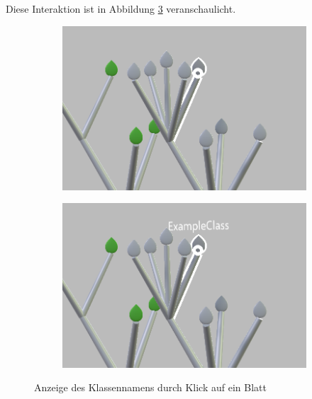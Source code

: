 Diese Interaktion ist in Abbildung \ref{fig:leaf-interaction} veranschaulicht.

\setlength{\fwidth}{.49\textwidth}
\begin{figure}[htb]
  \centering
  \begin{subfigure}[b]{\fwidth}
   \includegraphics[width=\textwidth]{figures/leaf-focused}
    \label{fig:leaf-focused}
  \end{subfigure}
  \hfill
  \begin{subfigure}[b]{\fwidth}
  	\includegraphics[width=\textwidth]{figures/leaf-clicked}
  	 \label{fig:leaf-clicked}
  \end{subfigure}
  \caption{Anzeige des Klassennamens durch Klick auf ein Blatt} \label{fig:leaf-interaction}
\end{figure}

